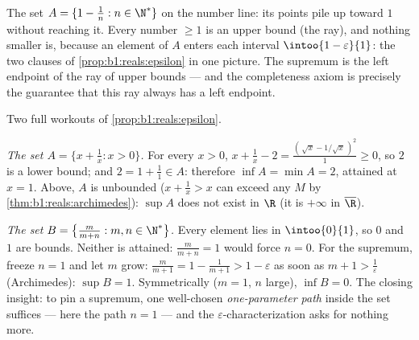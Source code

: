 \begin{omfigure}

{\small The set $A = \{1 - \frac1n : n \in \N^*\}$ on the number
line: its points pile up toward $1$ without reaching it. Every
number $\geq 1$ is an upper bound (the ray), and nothing smaller
is, because an element of $A$ enters each interval
$\intoo{1 - \varepsilon}{1}$: the two clauses of
\cref{prop:b1:reals:epsilon} in one picture. The supremum is the
left endpoint of the ray of upper bounds --- and the completeness
axiom is precisely the guarantee that this ray always has a left
endpoint.}
\end{omfigure}

\begin{example}\label{ex:b1:reals:supcompute}
Two full workouts of \cref{prop:b1:reals:epsilon}.

\emph{The set $A = \{x + \frac1x : x > 0\}$.} For every $x > 0$,
$x + \frac1x - 2 = \frac{(\,\sqrt x - 1/\sqrt x\,)^2}{1} \geq 0$,
so $2$ is a lower bound; and $2 = 1 + \frac11 \in A$: therefore
$\inf A = \min A = 2$, attained at $x = 1$. Above, $A$ is
unbounded ($x + \frac1x > x$ can exceed any $M$ by
\cref{thm:b1:reals:archimedes}): $\sup A$ does not exist in $\R$
(it is $+\infty$ in $\overline\R$).

\emph{The set $B = \bigl\{\frac{m}{m + n} : m, n \in
\N^*\bigr\}$.} Every element lies in $\intoo{0}{1}$, so $0$ and
$1$ are bounds. Neither is attained: $\frac{m}{m+n} = 1$ would
force $n = 0$. For the supremum, freeze $n = 1$ and let $m$ grow:
$\frac{m}{m+1} = 1 - \frac{1}{m+1} > 1 - \varepsilon$ as soon as
$m + 1 > \frac1\varepsilon$ (Archimedes): $\sup B = 1$.
Symmetrically ($m = 1$, $n$ large), $\inf B = 0$. The closing
insight: to pin a supremum, one well-chosen \emph{one-parameter
path} inside the set suffices --- here the path $n = 1$ --- and
the $\varepsilon$-characterization asks for nothing more.
\end{example}

